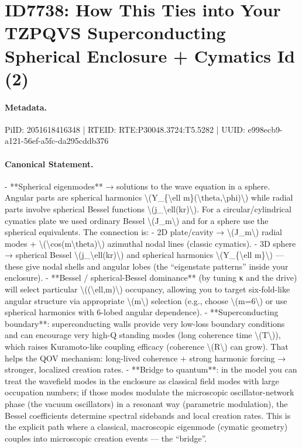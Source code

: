 \section*{ID7738: How This Ties into Your TZPQVS Superconducting Spherical Enclosure + Cymatics Id (2)}
\paragraph{Metadata.}
PiID: 2051618416348 | RTEID: RTE:P30048.3724:T5.5282 | UUID: e998ecb9-a121-56ef-a5fc-da295cddb376

\paragraph{Canonical Statement.}
- **Spherical eigenmodes** → solutions to the wave equation in a sphere. Angular parts are spherical harmonics \textbackslash{}(Y\_\{\textbackslash{}ell m\}(\textbackslash{}theta,\textbackslash{}phi)\textbackslash{}) while radial parts involve spherical Bessel functions \textbackslash{}(j\_\textbackslash{}ell(kr)\textbackslash{}). For a circular/cylindrical cymatics plate we used ordinary Bessel \textbackslash{}(J\_m\textbackslash{}) and for a sphere use the spherical equivalents. The connection is: - 2D plate/cavity → \textbackslash{}(J\_m\textbackslash{}) radial modes + \textbackslash{}(\textbackslash{}cos(m\textbackslash{}theta)\textbackslash{}) azimuthal nodal lines (classic cymatics). - 3D sphere → spherical Bessel \textbackslash{}(j\_\textbackslash{}ell(kr)\textbackslash{}) and spherical harmonics \textbackslash{}(Y\_\{\textbackslash{}ell m\}\textbackslash{}) — these give nodal shells and angular lobes (the “eigenstate patterns” inside your enclosure). - **Bessel / spherical-Bessel dominance** (by tuning κ and the drive) will select particular \textbackslash{}((\textbackslash{}ell,m)\textbackslash{}) occupancy, allowing you to target six-fold-like angular structure via appropriate \textbackslash{}(m\textbackslash{}) selection (e.g., choose \textbackslash{}(m=6\textbackslash{}) or use spherical harmonics with 6-lobed angular dependence). - **Superconducting boundary**: superconducting walls provide very low-loss boundary conditions and can encourage very high-Q standing modes (long coherence time \textbackslash{}(T\textbackslash{})), which raises Kuramoto-like coupling efficacy (coherence \textbackslash{}(R\textbackslash{}) can grow). That helps the QOV mechanism: long-lived coherence + strong harmonic forcing → stronger, localized creation rates. - **Bridge to quantum**: in the model you can treat the wavefield modes in the enclosure as classical field modes with large occupation numbers; if those modes modulate the microscopic oscillator-network phase (the vacuum oscillators) in a resonant way (parametric modulation), the Bessel coefficients determine spectral sidebands and local creation rates. This is the explicit path where a classical, macroscopic eigenmode (cymatic geometry) couples into microscopic creation events — the “bridge”.


